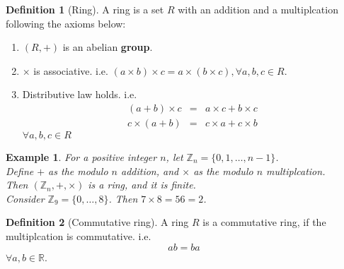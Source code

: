 \documentclass{article}
\theoremstyle{MyNonumberplain}
\theoremstyle{break}
\theoremstyle{break}
\newtheorem{example}{Example}[section]
\theoremstyle{break}
\theoremstyle{definition}
\theoremstyle{break}
\newtheorem{definition}{Definition}[section]
\begin{document}
\begin{defbox}
    \begin{definition}[Ring]
        A ring is a set $R$ with an addition and a multiplcation following the axioms
        below:\\
        \begin{enumerate}
        \item $(R, +)$ is an abelian \textbf{group}.\\
        
        \item $\times$ is associative. i.e. $(a \times b) \times c = a \times (b
        \times c), \forall a, b, c \in R$.\\
        
        \item Distributive law holds. i.e.
        \begin{eqnarray*}
            (a + b) \times c & = & a \times c + b \times c\\
            c \times (a + b) & = & c \times a + c \times b
        \end{eqnarray*}
        $\forall a, b, c \in R$
        \end{enumerate}
    \end{definition}
\end{defbox}

\begin{expbox}
    \begin{example}
        For a positive integer $n$, let $\mathbb{Z}_n = \{ 0, 1, \ldots, n - 1 \}$.\\

        Define $+$ as the modulo $n$ addition, and $\times$ as the modulo $n$
        multiplcation.\\

        Then $(\mathbb{Z}_n, +, \times)$ is a ring, and it is finite.\\ 

        Consider $\mathbb{Z}_9 = \{ 0, \ldots, 8 \}$. Then $7 \times 8 = 56 = 2$.
    \end{example}
\end{expbox}

\begin{defbox}
    \begin{definition}[Commutative ring]
        A ring $R$ is a commutative ring, if the multiplcation is commutative. i.e.
        \[ a b = b a \]
        $\forall a, b \in \mathbb{R}$.
    \end{definition}
\end{defbox}
\end{document}
